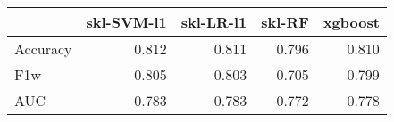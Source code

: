 \begin{tabular}{lrrrr}
\toprule
{} &  skl-SVM-l1 &  skl-LR-l1 &  skl-RF &  xgboost \\
\midrule
Accuracy &       0.812 &      0.811 &   0.796 &    0.810 \\
F1w      &       0.805 &      0.803 &   0.705 &    0.799 \\
AUC      &       0.783 &      0.783 &   0.772 &    0.778 \\
\bottomrule
\end{tabular}
